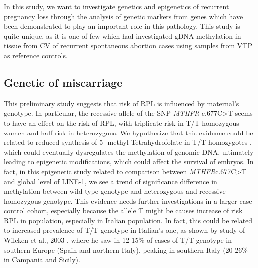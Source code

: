 \documentclass[journal,article,submit,moreauthors,pdftex]{Definitions/mdpi}
\begin{document}
\noindent In this study, we want to investigate genetics and epigenetics of recurrent pregnancy loss through the analysis of genetic markers from genes which have been demonstrated to play an important role in this pathology. This study is quite unique, as it is one of few which had investigated gDNA methylation in tissue from CV of recurrent spontaneous abortion cases using samples from VTP as reference controls.


\subsection{Genetic of miscarriage}

\noindent This preliminary study suggests that risk of RPL is influenced by maternal's genotype. In particular, the recessive allele of the SNP \textit{MTHFR} c.677C>T seems to have an effect on the risk of RPL, with triplicate risk in T/T homozygous women and half risk in heterozygous. We hypothesize that this evidence could be related to reduced synthesis of 5- methyl-Tetrahydrofolate in T/T homozygotes \cite{jacques1996relation}, which could eventually dysregulates the methylation of genomic DNA, ultimately leading to epigenetic modifications, which could affect the survival of embryos. In fact, in this epigenetic study related to comparison between \textit{MTHFR}c.677C>T and global level of LINE-1, we see a trend of significance difference in methylation between wild type genotype and heterozygous and recessive homozygous genotype. This evidence needs further investigations in a larger case-control cohort, especially because the allele T might be causes increase of risk RPL in population, especially in Italian population. In fact, this could be related to increased prevalence of T/T genotype in Italian's one, as shown by study of Wilcken et al., 2003 \cite{wilcken2003geographical}, where he saw in 12-15\% of cases of T/T genotype in southern Europe (Spain and northern Italy), peaking in southern Italy (20-26\% in Campania and Sicily).\\
\end{document}
